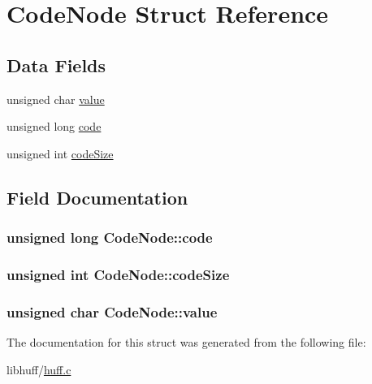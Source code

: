 \hypertarget{structCodeNode}{}\section{Code\+Node Struct Reference}
\label{structCodeNode}
\subsection*{Data Fields}
\begin{DoxyCompactItemize}
\item 
unsigned char \hyperlink{structCodeNode_aa1a1455e17cd12a923cca88b040f791e}{value}
\item 
unsigned long \hyperlink{structCodeNode_a919b38ecdf1e9b61392803a10a050910}{code}
\item 
unsigned int \hyperlink{structCodeNode_aa41fc504697d8b80caa24872b9d91e94}{code\+Size}
\end{DoxyCompactItemize}


\subsection{Field Documentation}
\hypertarget{structCodeNode_a919b38ecdf1e9b61392803a10a050910}{}
\subsubsection[{code}]{\setlength{\rightskip}{0pt plus 5cm}unsigned long Code\+Node\+::code}\label{structCodeNode_a919b38ecdf1e9b61392803a10a050910}
\hypertarget{structCodeNode_aa41fc504697d8b80caa24872b9d91e94}{}
\subsubsection[{code\+Size}]{\setlength{\rightskip}{0pt plus 5cm}unsigned int Code\+Node\+::code\+Size}\label{structCodeNode_aa41fc504697d8b80caa24872b9d91e94}
\hypertarget{structCodeNode_aa1a1455e17cd12a923cca88b040f791e}{}
\subsubsection[{value}]{\setlength{\rightskip}{0pt plus 5cm}unsigned char Code\+Node\+::value}\label{structCodeNode_aa1a1455e17cd12a923cca88b040f791e}


The documentation for this struct was generated from the following file\+:\begin{DoxyCompactItemize}
\item 
libhuff/\hyperlink{huff_8c}{huff.\+c}\end{DoxyCompactItemize}
